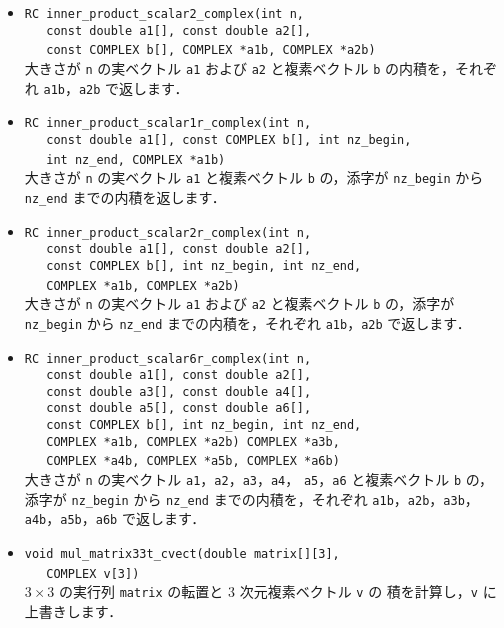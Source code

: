 \begin{itemize}
\item \verb|RC inner_product_scalar2_complex(int n, | \\
	\verb|   const double a1[], const double a2[], | \\
	\verb|   const COMPLEX b[], COMPLEX *a1b, COMPLEX *a2b)| \ \\
大きさが \verb|n| の実ベクトル \verb|a1| および \verb|a2| と複素ベクトル 
\verb|b| の内積を，それぞれ \verb|a1b|，\verb|a2b| で返します．

\item \verb|RC inner_product_scalar1r_complex(int n, | \\
	\verb|   const double a1[], const COMPLEX b[], int nz_begin, | \\
	\verb|   int nz_end, COMPLEX *a1b)| \ \\
大きさが \verb|n| の実ベクトル \verb|a1| と複素ベクトル \verb|b| の，添字が 
\verb|nz_begin| から \verb|nz_end| までの内積を返します．

\item \verb|RC inner_product_scalar2r_complex(int n, | \\
	\verb|   const double a1[], const double a2[], | \\
	\verb|   const COMPLEX b[], int nz_begin, int nz_end, | \\
	\verb|   COMPLEX *a1b, COMPLEX *a2b)| \ \\
大きさが \verb|n| の実ベクトル \verb|a1| および \verb|a2| と複素ベクトル 
\verb|b| の，添字が \verb|nz_begin| から \verb|nz_end| までの内積を，それぞれ
\verb|a1b|，\verb|a2b| で返します．

\item \verb|RC inner_product_scalar6r_complex(int n, | \\
	\verb|   const double a1[], const double a2[], | \\
	\verb|   const double a3[], const double a4[], | \\
	\verb|   const double a5[], const double a6[], | \\
	\verb|   const COMPLEX b[], int nz_begin, int nz_end, | \\
	\verb|   COMPLEX *a1b, COMPLEX *a2b) COMPLEX *a3b, | \\
	\verb|   COMPLEX *a4b, COMPLEX *a5b, COMPLEX *a6b)| \ \\
大きさが \verb|n| の実ベクトル \verb|a1|，\verb|a2|，\verb|a3|，\verb|a4|，
\verb|a5|，\verb|a6| と複素ベクトル \verb|b| の，添字が \verb|nz_begin| から 
\verb|nz_end| までの内積を，それぞれ \verb|a1b|，\verb|a2b|，\verb|a3b|，
\verb|a4b|，\verb|a5b|，\verb|a6b| で返します．

\item \verb|void mul_matrix33t_cvect(double matrix[][3], | \\
	\verb|   COMPLEX v[3])| \ \\
$3 \times 3$ の実行列 \verb|matrix| の転置と $3$ 次元複素ベクトル \verb|v| の
積を計算し，\verb|v| に上書きします．

\end{itemize}


